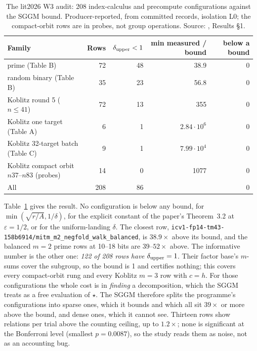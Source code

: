 \begin{table}[t]
\centering\small
\begin{tabularx}{\linewidth}{@{}Xrrrr@{}}
\toprule
Family & Rows & $\delta_{\rm upper}<1$ & min measured / bound & below a bound \\
\midrule
prime (Table B) & 72 & 48 & 38.9 & 0 \\
random binary (Table B) & 35 & 23 & 56.8 & 0 \\
Koblitz round 5 ($n\le41$) & 72 & 13 & 355 & 0 \\
Koblitz one target (Table A) & 6 & 1 & $2.84\cdot10^6$ & 0 \\
Koblitz 32-target batch (Table C) & 9 & 1 & $7.99\cdot10^4$ & 0 \\
Koblitz compact orbit $n37$--$n83$ (probes) & 14 & 0 & 1077 & 0 \\
\midrule
All & 208 & 86 & & 0 \\
\bottomrule
\end{tabularx}
\caption[]{The lit2026 W3 audit: 208 index-calculus and precompute
configurations against the SGGM bound. Producer-reported, from committed
records, isolation L0; the compact-orbit rows are in probes, not group
operations. Source: ,
Results \S1.}
\label{tab:um-w3}
\end{table}

Table~\ref{tab:um-w3} gives the result. No configuration is below any
bound, for $\min(\sqrt{r/A},1/\delta)$, for the explicit constant of the
paper's Theorem~3.2 at $\varepsilon=1/2$, or for the uniform-landing
$\delta$. The closest row,
\texttt{icv1-fp14-tm43-158b6914/mitm\_m2\_negfold\_walk\_balanced}, is
$38.9\times$ above its bound, and the balanced $m=2$ prime rows at 10--18
bits are $39$--$52\times$ above. The informative number is the other one:
\emph{122 of 208 rows have $\delta_{\rm upper}=1$}. Their factor base's
$m$-sums cover the subgroup, so the bound is 1 and certifies nothing; this
covers every compact-orbit rung and every Koblitz $m=3$ row with $c=h$. For
those configurations the whole cost is in \emph{finding} a decomposition,
which the SGGM treats as a free evaluation of $\star$. The SGGM therefore
splits the programme's configurations into sparse ones, which it bounds and
which all sit $39\times$ or more above the bound, and dense ones, which it
cannot see. Thirteen rows show relations per trial above the counting
ceiling, up to $1.2\times$; none is significant at the Bonferroni level
(smallest $p=0.0087$), so the study reads them as noise, not as an
accounting bug.


